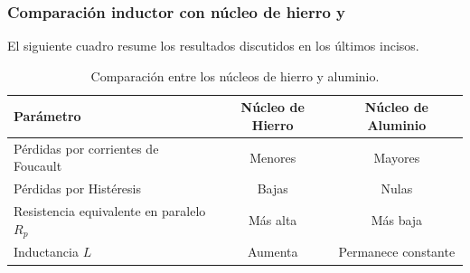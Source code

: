 \subsubsection{Comparación inductor con núcleo de hierro y }

El siguiente cuadro resume los resultados discutidos en los últimos incisos. 
\begin{table}[h]
    \centering
    \caption{Comparación entre los núcleos de hierro y aluminio.}
    \label{tab:comparacion_hierro_aluminio}
    \begin{tabular}{>{\raggedright\arraybackslash}p{}cc}
        \toprule
        Parámetro & Núcleo de Hierro & Núcleo de Aluminio \\
        \midrule
        Pérdidas por corrientes de Foucault & Menores & Mayores \\
        Pérdidas por Histéresis & Bajas & Nulas\\
        Resistencia equivalente en paralelo $R_p$ & Más alta & Más baja \\
        Inductancia $L$ & Aumenta & Permanece constante \\
        \bottomrule
    \end{tabular}
\end{table}